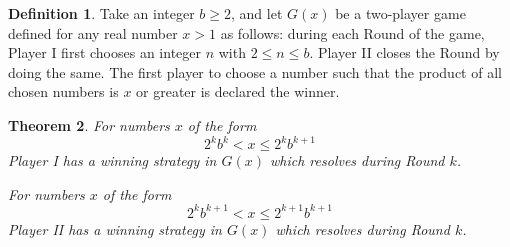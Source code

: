 \documentclass[11pt]{article}
\theoremstyle{plain}
\newtheorem{theorem}{Theorem}
\theoremstyle{definition}
\newtheorem{definition}[theorem]{Definition}
\theoremstyle{remark}
\newcommand{\<}{\langle}
\renewcommand{\>}{\rangle}
\begin{document}
\begin{definition}
Take an integer $b\geq 2$, and let $G(x)$ be a two-player game defined for any real number $x>1$ as follows: during each Round of the game, Player I first chooses an integer $n$ with $2\leq n \leq b$. Player II closes the Round by doing the same. The first player to choose a number such that the product of all chosen numbers is $x$ or greater is declared the winner.
\end{definition}

\begin{theorem}
For numbers $x$ of the form
  \[
    2^kb^k < x  \leq 2^kb^{k+1}
  \]
Player I has a winning strategy in $G(x)$ which resolves during Round $k$.

For numbers $x$ of the form
  \[
    2^kb^{k+1} < x \leq 2^{k+1}b^{k+1}
  \]
Player II has a winning strategy in $G(x)$ which resolves during Round $k$.
\end{theorem}
\end{document}
